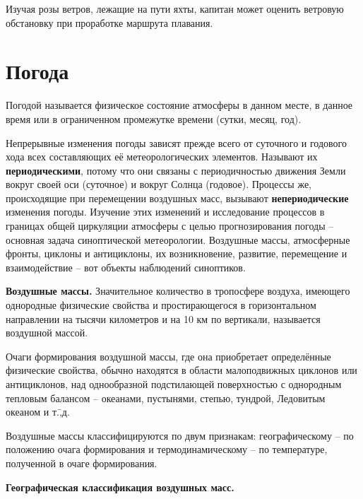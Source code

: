 Изучая розы ветров, лежащие на пути яхты, капитан может оценить
ветровую обстановку при проработке маршрута плавания.

\section{Погода}

Погодой называется физическое состояние атмосферы в данном месте, в
данное время или в ограниченном промежутке времени (сутки, месяц,
год).

Непрерывные изменения погоды зависят прежде всего от суточного и
годового хода всех составляющих её метеорологических
элементов. Называют их \textbf{периодическими}, потому что они связаны
с периодичностью движения Земли вокруг своей оси (суточное) и вокруг
Солнца (годовое). Процессы же, происходящие при перемещении воздушных
масс, вызывают \textbf{непериодические} изменения погоды. Изучение
этих изменений и исследование процессов в границах общей циркуляции
атмосферы с целью прогнозирования погоды \--- основная задача
синоптической метеорологии. Воздушные массы, атмосферные фронты,
циклоны и антициклоны, их возникновение, развитие, перемещение и
взаимодействие \--- вот объекты наблюдений синоптиков.

\textbf{Воздушные массы.} Значительное
количество в тропосфере воздуха, имеющего однородные физические
свойства и простирающегося в горизонтальном направлении на тысячи
километров и на 10 км по вертикали, называется воздушной
массой.

Очаги формирования воздушной массы, где она приобретает определённые
физические свойства, обычно находятся в области малоподвижных циклонов
или антициклонов, над однообразной подстилающей поверхностью с
однородным тепловым балансом \--- океанами, пустынями, степью,
тундрой, Ледовитым океаном и т.\=,д.

Воздушные массы классифицируются по двум признакам: географическому
\--- по положению очага формирования и термодинамическому \--- по
температуре, полученной в очаге формирования.

\textbf{Географическая классификация воздушных масс.}

